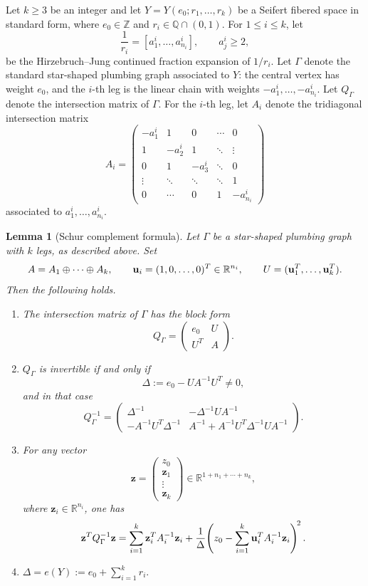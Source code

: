 \documentclass[11pt]{amsart}
\theoremstyle{plain}
\newtheorem{lemma}[theorem]{Lemma}
\theoremstyle{definition}
\theoremstyle{remark}
\newcommand{\R}{\mathbb{R}}
\newcommand{\Q}{\mathbb{Q}}
\newcommand{\Z}{\mathbb{Z}}
\begin{document}
Let $k\geq 3$ be an integer and let $Y=Y(e_0;r_1,\ldots,r_k)$ be a
Seifert fibered space in standard form, where $e_0\in\Z$ and
$r_i\in\Q\cap(0,1)$. For $1\leq i\leq k$, let
\[
\frac{1}{r_i}=[a_1^i,\dots,a_{n_i}^i],
\qquad a_j^i\ge 2,
\]
be the Hirzebruch--Jung continued fraction expansion of $1/r_i$. Let
$\Gamma$ denote the standard star-shaped plumbing graph associated to
$Y$: the central vertex has weight $e_0$, and the $i$-th leg is the
linear chain with weights $-a_1^i,\dots,-a_{n_i}^i$. Let $Q_\Gamma$
denote the intersection matrix of $\Gamma$. For the $i$-th leg, let
$A_i$ denote the tridiagonal intersection matrix
\[
A_i=
\begin{pmatrix}
-a_1^i & 1 & 0 & \cdots & 0\\
1 & -a_2^i & 1 & \ddots & \vdots\\
0 & 1 & -a_3^i & \ddots & 0\\
\vdots & \ddots & \ddots & \ddots & 1\\
0 & \cdots & 0 & 1 & -a_{n_i}^i
\end{pmatrix}
\]
associated to $a_1^i,\dots,a_{n_i}^i$.

\begin{lemma}[Schur complement formula]\label{lem:schur-k}
Let $\Gamma$ be a star-shaped plumbing graph with $k$ legs, as
described above. Set
\[
A=A_1\oplus\cdots\oplus A_k,
\qquad
{\bf u}_i=(1,0,\dots,0)^T\in\R^{n_i},
\qquad
U=({\bf u}_1^T,\dots,{\bf u}_k^T).
\]
Then the following holds.
\begin{enumerate}[label=(\roman*)]
\item The intersection matrix of $\Gamma$ has the block form
\[
Q_\Gamma=
\begin{pmatrix}
e_0 & U\\
U^T & A
\end{pmatrix}.
\]

\item $Q_\Gamma$ is invertible if and only if
\[
\Delta:=e_0-UA^{-1}U^T\neq 0,
\]
and in that case
\[
Q_\Gamma^{-1}
=
\begin{pmatrix}
\Delta^{-1} & -\Delta^{-1}UA^{-1}\\
-A^{-1}U^T\Delta^{-1} & A^{-1}+A^{-1}U^T\Delta^{-1}UA^{-1}
\end{pmatrix}.
\]

\item For any vector
\[
\mathbf z=
\begin{pmatrix}
z_0\\
\mathbf z_1\\
\vdots\\
\mathbf z_k
\end{pmatrix}\in\R^{1+n_1+\cdots+n_k},
\]
where $\mathbf z_i\in\R^{n_i}$, one has
\[
\mathbf z^TQ_\Gamma^{-1}\mathbf z
=
\sum_{i=1}^k \mathbf z_i^TA_i^{-1}\mathbf z_i
+
\frac{1}{\Delta}
\!\left(z_0-\sum_{i=1}^k {\bf u}_i^TA_i^{-1}\mathbf z_i\right)^{\!2}.
\]

\item
$
\Delta=e(Y):=e_0+\sum_{i=1}^k r_i.
$
\end{enumerate}
\end{lemma}
\end{document}

